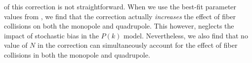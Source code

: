                                                                                                                                                                                                                                                                          of this correction is not straightforward. When we use the best-fit parameter 
                                                                                                                                                                                                                                                                         values from \cite{Beutler:2014aa}, we find that the correction actually 
                                                                                                                                                                                                                                                                         {\em increases} the effect of fiber collisions on both the monopole 
                                                                                                                                                                                                                                                                         and quadrupole. This however, neglects the impact of stochastic bias 
                                                                                                                                                                                                                                                                         in the $P(k)$ model. Nevertheless, we also find that no value of $N$ in the 
                                                                                                                                                                                                                                                                         \cite{Beutler:2014aa} correction can simultaneously 
                                                                                                                                                                                                                                                                         account for the effect of fiber collisions in both the monopole and quadrupole.

